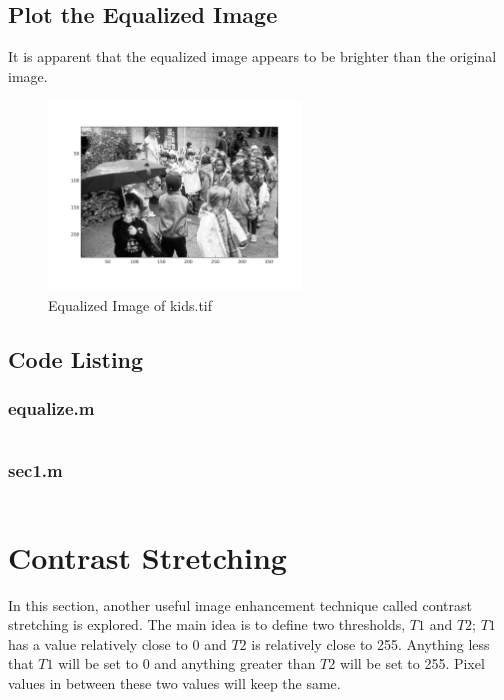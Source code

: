 \documentclass{article}
\begin{document}
\subsection{Plot the Equalized Image}
	It is apparent that the equalized image appears to be brighter than the
	original image.
	\begin{figure}[h]
		\begin{center}
			\includegraphics[width=0.6\textwidth]{kids_equ.png}
			\caption{Equalized Image of kids.tif}
		\end{center}
	\end{figure}

\subsection{Code Listing}
	\subsubsection{equalize.m}
		\inputminted[tabsize=4,breaklines]{matlab}{equalize.m}
	\subsubsection{sec1.m}
		\inputminted[tabsize=4,breaklines]{matlab}{sec1.m}

\section{Contrast Stretching}
	In this section, another useful image enhancement technique called contrast
	stretching is explored. The main idea is to define two thresholds, $T1$ and
	$T2$; $T1$ has a value relatively close to 0 and $T2$ is relatively close to
	255. Anything less that $T1$ will be set to 0 and anything greater than $T2$
	will be set to 255. Pixel values in between these two values will keep the
	same.
\end{document}

